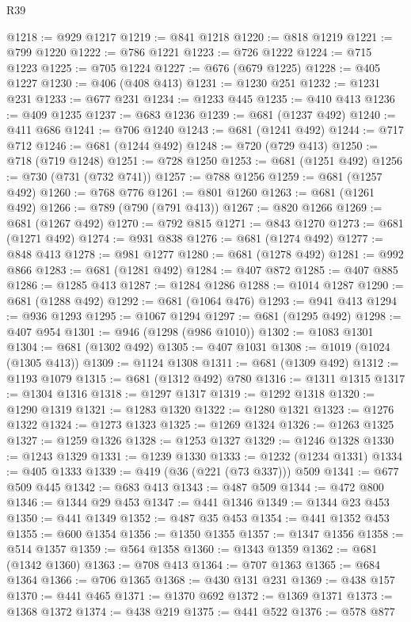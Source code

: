 \begin{lexlean}{R39}
\begin{coremodule}
@1218 := @929 @1217
@1219 := @841 @1218
@1220 := @818 @1219
@1221 := @799 @1220
@1222 := @786 @1221
@1223 := @726 @1222
@1224 := @715 @1223
@1225 := @705 @1224
@1227 := @676 (@679 @1225)
@1228 := @405 @1227
@1230 := @406 (@408 @413)
@1231 := @1230 @251
@1232 := @1231 @231
@1233 := @677 @231
@1234 := @1233 @445
@1235 := @410 @413
@1236 := @409 @1235
@1237 := @683 @1236
@1239 := @681 (@1237 @492)
@1240 := @411 @686
@1241 := @706 @1240
@1243 := @681 (@1241 @492)
@1244 := @717 @712
@1246 := @681 (@1244 @492)
@1248 := @720 (@729 @413)
@1250 := @718 (@719 @1248)
@1251 := @728 @1250
@1253 := @681 (@1251 @492)
@1256 := @730 (@731 (@732 @741))
@1257 := @788 @1256
@1259 := @681 (@1257 @492)
@1260 := @768 @776
@1261 := @801 @1260
@1263 := @681 (@1261 @492)
@1266 := @789 (@790 (@791 @413))
@1267 := @820 @1266
@1269 := @681 (@1267 @492)
@1270 := @792 @815
@1271 := @843 @1270
@1273 := @681 (@1271 @492)
@1274 := @931 @838
@1276 := @681 (@1274 @492)
@1277 := @848 @413
@1278 := @981 @1277
@1280 := @681 (@1278 @492)
@1281 := @992 @866
@1283 := @681 (@1281 @492)
@1284 := @407 @872
@1285 := @407 @885
@1286 := @1285 @413
@1287 := @1284 @1286
@1288 := @1014 @1287
@1290 := @681 (@1288 @492)
@1292 := @681 (@1064 @476)
@1293 := @941 @413
@1294 := @936 @1293
@1295 := @1067 @1294
@1297 := @681 (@1295 @492)
@1298 := @407 @954
@1301 := @946 (@1298 (@986 @1010))
@1302 := @1083 @1301
@1304 := @681 (@1302 @492)
@1305 := @407 @1031
@1308 := @1019 (@1024 (@1305 @413))
@1309 := @1124 @1308
@1311 := @681 (@1309 @492)
@1312 := @1193 @1079
@1315 := @681 (@1312 @492) @780
@1316 := @1311 @1315
@1317 := @1304 @1316
@1318 := @1297 @1317
@1319 := @1292 @1318
@1320 := @1290 @1319
@1321 := @1283 @1320
@1322 := @1280 @1321
@1323 := @1276 @1322
@1324 := @1273 @1323
@1325 := @1269 @1324
@1326 := @1263 @1325
@1327 := @1259 @1326
@1328 := @1253 @1327
@1329 := @1246 @1328
@1330 := @1243 @1329
@1331 := @1239 @1330
@1333 := @1232 (@1234 @1331)
@1334 := @405 @1333
@1339 := @419 (@36 (@221 (@73 @337))) @509
@1341 := @677 @509 @445
@1342 := @683 @413
@1343 := @487 @509
@1344 := @472 @800
@1346 := @1344 @29 @453
@1347 := @441 @1346
@1349 := @1344 @23 @453
@1350 := @441 @1349
@1352 := @487 @35 @453
@1354 := @441 @1352 @453
@1355 := @600 @1354
@1356 := @1350 @1355
@1357 := @1347 @1356
@1358 := @514 @1357
@1359 := @564 @1358
@1360 := @1343 @1359
@1362 := @681 (@1342 @1360)
@1363 := @708 @413
@1364 := @707 @1363
@1365 := @684 @1364
@1366 := @706 @1365
@1368 := @430 @131 @231
@1369 := @438 @157
@1370 := @441 @465
@1371 := @1370 @692
@1372 := @1369 @1371
@1373 := @1368 @1372
@1374 := @438 @219
@1375 := @441 @522
@1376 := @578 @877

\end{coremodule}
\end{lexlean}
